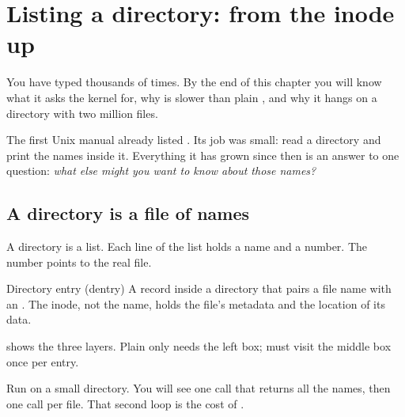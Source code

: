\chapter{Listing a directory:  from the inode up}
\label{ch:ls}

You have typed  thousands of times. By the end of this chapter you will know what it asks the kernel for, why  is slower than plain , and why it hangs on a directory with two million files.

\begin{origin}[1971, Unix V1]
The first Unix manual already listed . Its job was small: read a directory and print the names inside it. Everything it has grown since then is an answer to one question: \emph{what else might you want to know about those names?}
\end{origin}

\section{A directory is a file of names}

\begin{plainwords}
A directory is a list. Each line of the list holds a name and a number. The number points to the real file.
\end{plainwords}

\begin{definition}{Directory entry (dentry)}
A record inside a directory that pairs a file name with an . The inode, not the name, holds the file's metadata and the location of its data.
\end{definition}

 shows the three layers. Plain  only needs the left box;  must visit the middle box once per entry.


\begin{underthehood}
Run  on a small directory. You will see one  call that returns all the names, then one  call per file. That second loop is the cost of .
\end{underthehood}


